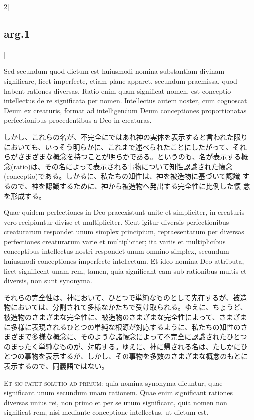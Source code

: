 \documentclass[paper=a4paper,fontsize=10pt,jafontsize=9pt,titlepage]{jlreq}
\begin{document}
\begin{paracol}{2}[\subsection{arg.1}]
\switchcolumn*

Sed secundum quod dictum est huiusmodi nomina substantiam divinam
significare, licet imperfecte, etiam plane apparet, secundum
praemissa, quod habent rationes diversas. Ratio enim quam significat
nomen, est conceptio intellectus de re significata per
nomen. Intellectus autem noster, cum cognoscat Deum ex creaturis,
format ad intelligendum Deum conceptiones proportionatas
perfectionibus procedentibus a Deo in creaturas.

\switchcolumn

しかし、これらの名が、不完全にではあれ神の実体を表示すると言われた限り
においても、いっそう明らかに、これまで述べられたことにしたがって、それ
らがさまざまな概念を持つことが明らかである。というのも、名が表示する概
念(ratio)は、その名によって表示される事物について知性認識された懐念
(conceptio)である。しかるに、私たちの知性は、神を被造物に基づいて認識
するので、神を認識するために、神から被造物へ発出する完全性に比例した懐
念を形成する。

\switchcolumn*

Quae quidem perfectiones in Deo praeexistunt unite et simpliciter, in
creaturis vero recipiuntur divise et multipliciter. Sicut igitur
diversis perfectionibus creaturarum respondet unum simplex principium,
repraesentatum per diversas perfectiones creaturarum varie et
multipliciter; ita variis et multiplicibus conceptibus intellectus
nostri respondet unum omnino simplex, secundum huiusmodi conceptiones
imperfecte intellectum. Et ideo nomina Deo attributa, licet
significent unam rem, tamen, quia significant eam sub rationibus
multis et diversis, non sunt synonyma.

\switchcolumn

それらの完全性は、神において、ひとつで単純なものとして先在するが、被造
物においては、分割されて多様なかたちで受け取られる。ゆえに、ちょうど、
被造物のさまざまな完全性に、被造物のさまざまな完全性によって、さまざま
に多様に表現されるひとつの単純な根源が対応するように、私たちの知性のさ
まざまで多様な概念に、そのような諸懐念によって不完全に認識されたひとつ
のまったく単純なものが、対応する。ゆえに、神に帰される名は、たしかにひ
とつの事物を表示するが、しかし、その事物を多数のさまざまな概念のもとに
表示するので、同義語ではない。

\switchcolumn*

{\scshape Et sic patet solutio ad primum}: quia nomina synonyma dicuntur,
quae significant unum secundum unam rationem. Quae enim significant
rationes diversas unius rei, non primo et per se unum significant,
quia nomen non significat rem, nisi mediante conceptione intellectus,
ut dictum est.


\end{paracol}
\end{document}
